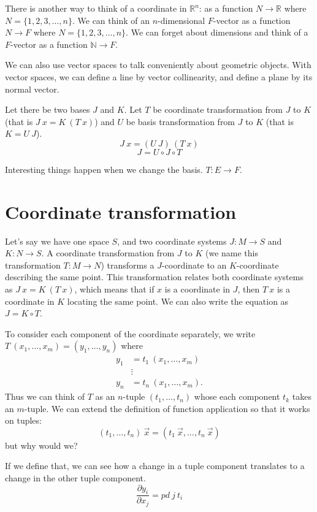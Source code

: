 There is another way to think of a coordinate in $\mathbb{R}^n$:
as a function $N \to \mathbb{R}$ where $N = \{1,2,3,\ldots,n\}$.
We can think of an $n$-dimensional $F$-vector as a function $N \to F$ where $N = \{1,2,3,\ldots,n\}$.
We can forget about dimensions and think of a $F$-vector as a function $\mathbb{N} \to F$.

We can also use vector spaces to talk conveniently about geometric objects.
With vector spaces, we can define a line by vector collinearity,
and define a plane by its normal vector.

Let there be two bases $J$ and $K$.
Let $T$ be coordinate transformation from $J$ to $K$
(that is $J~x = K~(T~x)$)
and $U$ be basis transformation from $J$ to $K$
(that is $K = U~J$).
\[
J~x = (U~J)~(T~x)
\]
\[
J = U \circ J \circ T
\]

Interesting things happen when we change the basis.
$T : E \to F$.

\section{Coordinate transformation}

Let's say we have one space $S$,
and two coordinate systems $J : M \to S$ and $K : N \to S$.
A coordinate transformation from $J$ to $K$ (we name this transformation $T : M \to N$)
transforms a $J$-coordinate
to an $K$-coordinate describing the same point.
This transformation relates both coordinate systems as
$J~x = K~(T~x)$, which means that if $x$ is a coordinate in $J$, then $T~x$ is a coordinate in $K$ locating the same point.
We can also write the equation as $J = K \circ T$.

To consider each component of the coordinate separately,
we write
$T~(x_1,\ldots,x_m) = (y_1,\ldots,y_n)$
where
\begin{align*}
y_1 &= t_1~(x_1,\ldots,x_m)
\\ &\vdots
\\ y_n &= t_n~(x_1,\ldots,x_m).
\end{align*}
Thus we can think of $T$ as an $n$-tuple $(t_1,\ldots,t_n)$
whose each component $t_k$ takes an $m$-tuple.
We can extend the definition of function application so that it works on tuples:
\[
(t_1,\ldots,t_n)~\vec{x} = (t_1~\vec{x}, \ldots, t_n~\vec{x})
\]
but why would we?

If we define that, we can see how a change in a tuple component translates
to a change in the other tuple component.
\[
\frac{\partial y_i}{\partial x_j} = pd~j~t_i
\]

